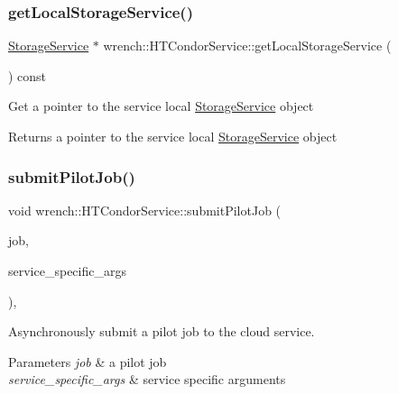 \subsubsection{\texorpdfstring{get\+Local\+Storage\+Service()}{getLocalStorageService()}}
{\footnotesize\ttfamily \hyperlink{classwrench_1_1_storage_service}{Storage\+Service} $\ast$ wrench\+::\+H\+T\+Condor\+Service\+::get\+Local\+Storage\+Service (\begin{DoxyParamCaption}{ }\end{DoxyParamCaption}) const}

Get a pointer to the service local \hyperlink{classwrench_1_1_storage_service}{Storage\+Service} object \begin{DoxyReturn}{Returns}
a pointer to the service local \hyperlink{classwrench_1_1_storage_service}{Storage\+Service} object 
\end{DoxyReturn}
\mbox{\label{classwrench_1_1_h_t_condor_service_a1fac4517c82ac0b0737cd6ca75bba952}} 
\subsubsection{\texorpdfstring{submit\+Pilot\+Job()}{submitPilotJob()}}
{\footnotesize\ttfamily void wrench\+::\+H\+T\+Condor\+Service\+::submit\+Pilot\+Job (\begin{DoxyParamCaption}\item[{\hyperlink{classwrench_1_1_pilot_job}{Pilot\+Job} $\ast$}]{job,  }\item[{std\+::map$<$ std\+::string, std\+::string $>$ \&}]{service\+\_\+specific\+\_\+args }\end{DoxyParamCaption})\hspace{0.3cm}{\ttfamily [override]}, {\ttfamily [virtual]}}



Asynchronously submit a pilot job to the cloud service. 


\begin{DoxyParams}{Parameters}
{\em job} & a pilot job \\
\hline
{\em service\+\_\+specific\+\_\+args} & service specific arguments\\
\hline
\end{DoxyParams}


